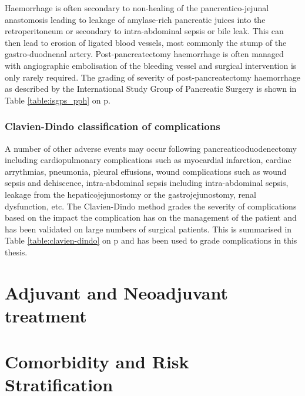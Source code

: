 Haemorrhage is often secondary to non-healing of the pancreatico-jejunal anastomosis leading to leakage of amylase-rich pancreatic juices into the retroperitoneum or secondary to intra-abdominal sepsis or bile leak.\parencite{tien_risk_2005, koukoutsis_haemorrhage_2006, choi_delayed_2004, balladur_bleeding_1996} This can then lead to erosion of ligated blood vessels, most commonly the stump of the gastro-duodnenal artery. Post-pancreatectomy haemorrhage is often managed with angiographic embolisation of the bleeding vessel and surgical intervention is only rarely required. The grading of severity of post-pancreatectomy haemorrhage as described by the International Study Group of Pancreatic Surgery\parencite{wente_postpancreatectomy_2007} is shown in Table \ref{table:isgps_pph} on p\pageref{table:isgps_pph}.



\subsubsection{Clavien-Dindo classification of complications}
A number of other adverse events may occur following pancreaticoduodenectomy including cardiopulmonary complications such as myocardial infarction, cardiac arrythmias, pneumonia, pleural effusions, wound complications such as wound sepsis and dehiscence, intra-abdominal sepsis including intra-abdominal sepsis, leakage from the hepaticojejunostomy or the gastrojejunostomy, renal dysfunction, etc. The Clavien-Dindo method grades the severity of complications based on the impact the complication has on the management of the patient and has been validated on large numbers of surgical patients.\parencite{clavien_clavien-dindo_2009, dindo_classification_2004} This is summarised in Table \ref{table:clavien-dindo} on p\pageref{table:clavien-dindo} and has been used to grade complications in this thesis.



\section{Adjuvant and Neoadjuvant treatment}

\clearpage

\section{Comorbidity and Risk Stratification}
\label{sec:comorbidity_risk_stratification}
